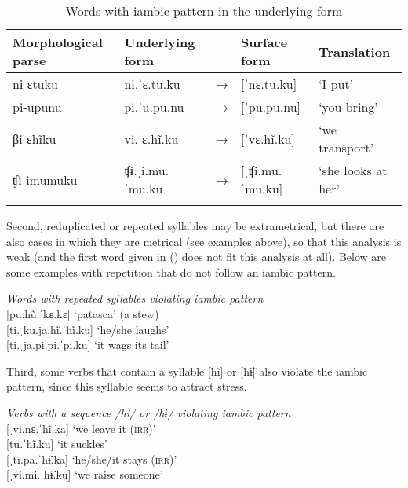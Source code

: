 \begin{table}
\caption{Words with iambic pattern in the underlying form}

\begin{tabularx}{\textwidth}{QlllQ}
\lsptoprule
 Morphological parse & Underlying form &  & Surface form & Translation\\
\midrule
nɨ-ɛtuku & nɨ.ˈɛ.tu.ku & → & [ˈnɛ.tu.ku] & ‘I put’\\
pi-upunu & pi.ˈu.pu.nu & → & [ˈpu.pu.nu] & ‘you bring’\\
    βi-ɛhĩku &  vi.ˈɛ.hĩ.ku &  → & [ˈvɛ.hĩ.ku] & ‘we transport’\\
    ʧɨ-imumuku & ʧɨ.ˌi.mu.ˈmu.ku & → & [ˌʧi.mu.ˈmu.ku] & ‘she looks at her’\\

\lspbottomrule
\end{tabularx}

\label{table:VEL-Iambs}
\end{table}

     
Second, reduplicated or repeated syllables may be extrametrical, but there are also cases in which they are metrical (see examples above), so that this analysis is weak (and the first word given in () does not fit this analysis at all). Below are some examples with repetition that do not follow an iambic pattern.
 
 \ea\label{ex:ViolaRED}
 \textit{Words with repeated syllables violating iambic pattern}\\
     {[}pu.hũ.ˈkɛ.kɛ] \tab ‘patasca’ (a stew)\\
   {[}ti.ˌku.ja.hĩ.ˈhĩ.ku] \tab ‘he/she laughs’\\
   {[}ti.ˌja.pi.pi.ˈpi.ku] \tab ‘it wags its tail’\\%
\xe


Third, some verbs that contain a syllable [hĩ] or [hɨ̃] also violate the iambic pattern, since this syllable seems to attract stress. 

\ea\label{ex:VIOLhi}
 \textit{Verbs with a sequence /hi/ or /hɨ/ violating iambic pattern}\\
     {[}ˌvi.nɛ.ˈhĩ.ka] \tab ‘we leave it (\textsc{irr})’\\
     {[}tu.ˈhĩ.ku] \tab\tab ‘it suckles’\\
    {[}ˌti.pa.ˈhɨ̃.ka] \tab ‘he/she/it stays (\textsc{irr})’\\
    {[}ˌvi.mi.ˈhɨ̃.ku] \tab  ‘we raise someone’\\
    \xe

